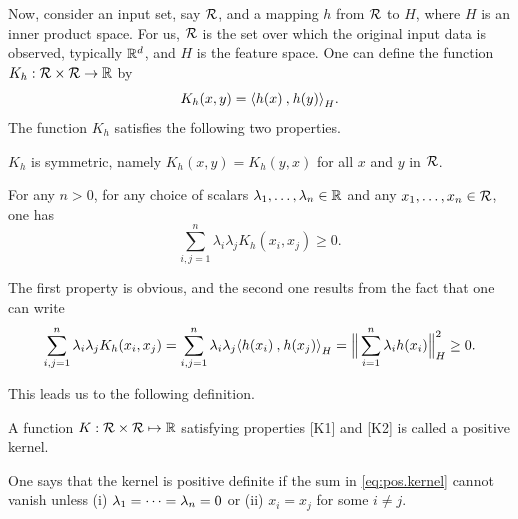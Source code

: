 Now, consider an input set, say ${\mathcal R}$, and a mapping $h$ from ${\mathcal R}$ to $H$, where $H$ is an inner product space. For us, ${\mathcal R}$ is the set over which the original input data is observed, typically ${\mathbb{R}}^d$, and $H$ is the feature space.  One can define the function
$K_h: {\mathcal R}\times{\mathcal R} \to {\mathbb{R}}$ by 
\[
K_h(x,y) = {\langle {h(x)}\mathbin{,} {h(y)}\rangle}_H.
\]
The function $K_h$ satisfies the following two properties.
\begin{enumerate}[label={[K\arabic*]}, wide=0pt]
\item $K_h$ is symmetric, namely $K_h(x,y) = K_h(y,x)$ for all $x$ and $y$ in ${\mathcal R}$. 
\item For any $n>0$, for any choice of scalars $\lambda_1, \dots, \lambda_n\in {\mathbb{R}}$ and any $x_1, \ldots, x_n \in {\mathcal R}$, one has
\begin{equation}
\label{eq:pos.kernel}
\sum_{i,j=1}^n \lambda_i \lambda_j K_h(x_i, x_j) \geq 0.
\end{equation}
\end{enumerate}
The first property is obvious, and the second one results from the fact that one can write
\begin{equation}
\label{eq:kh.pos.def}
\sum_{i,j=1}^n \lambda_i \lambda_j K_h(x_i, x_j) = \sum_{i,j=1}^n \lambda_i \lambda_j {\langle {h(x_i)}\mathbin{,} {h(x_j)}\rangle}_H = \Big\|\sum_{i=1}^n \lambda_i h(x_i)\Big\|_H^2 \geq 0.
\end{equation}

This leads us to the following definition.
\begin{definition}
\label{def:pos.kernel}
A function $K: {\mathcal R} \times{\mathcal R} \mapsto {\mathbb{R}}$ satisfying  properties [K1] and [K2]
is called a positive kernel.

One says that
the kernel is positive definite if the sum in \cref{eq:pos.kernel} cannot vanish unless (i) $\lambda_1 = \cdots = \lambda_n=0$ or (ii) $x_i=x_j$ for some $i\neq j$.
\end{definition}

